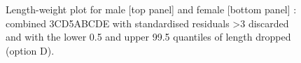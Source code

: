 \begin{figure}[htp]
\captionsetup[subfigure]{labelformat=empty}
\begin{center}
\newline
{}
\end{center}
\caption{Length-weight plot for male [top panel] and female [bottom panel] \fishname: combined 3CD5ABCDE with standardised residuals \textgreater 3 discarded and with the lower 0.5 and upper 99.5 quantiles of length dropped (option D).}
\label{fig:lwOptionD}
\end{figure}

